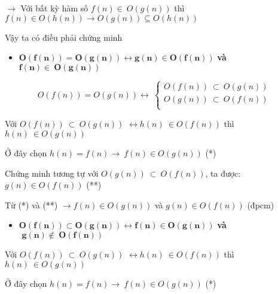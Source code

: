 \documentclass[
]{article}
\begin{document}
\(\rightarrow\) Với bất kỳ hàm số \(f(n) \in \ O(g(n))\) thì
\(f(n) \in O\left( h(n) \right)\mathbf{\rightarrow}O\left( g(n) \right) \subseteq O\left( h(n) \right)\)

Vậy ta có điều phải chứng minh

\begin{itemize}
\item
  \(\mathbf{O}\left( \mathbf{f}\left( \mathbf{n} \right) \right)\mathbf{= O}\left( \mathbf{g}\left( \mathbf{n} \right) \right)\mathbf{\leftrightarrow g}\left( \mathbf{n} \right)\mathbf{\in O}\left( \mathbf{f}\left( \mathbf{n} \right) \right)\)
  \textbf{và}
  \(\mathbf{f}\left( \mathbf{n} \right)\mathbf{\in \ O(g(n))}\)
\end{itemize}

\[O\left( f(n) \right) = O\left( g(n) \right) \leftrightarrow \ \left\{ \begin{matrix}
O\left( f(n) \right)\  \subset \ O\left( g(n) \right) \\
O\left( g(n) \right)\  \subset \ O\left( f(n) \right) \\
\end{matrix} \right.\ \]

Với \(O\left( f(n) \right)\  \subset \ O\left( g(n) \right)\)
\(\leftrightarrow h(n)\  \in O\left( f(n) \right)\) thì
\(h(n)\  \in O\left( g(n) \right)\)

Ở đây chọn \(h(n) = f(n) \rightarrow \ f(n) \in O\left( g(n) \right)\)
(*)

Chứng minh tương tự với
\(O\left( g(n) \right)\  \subset \ O\left( f(n) \right)\), ta được:
\(g(n) \in O\left( f(n) \right)\) (**)

Từ (*) và (**) \(\rightarrow f(n) \in O\left( g(n) \right)\) và
\(g(n) \in O\left( f(n) \right)\) (đpcm)

\begin{itemize}
\item
  \(\mathbf{O}\left( \mathbf{f}\left( \mathbf{n} \right) \right)\mathbf{\subset O}\left( \mathbf{g}\left( \mathbf{n} \right) \right)\mathbf{\leftrightarrow f}\left( \mathbf{n} \right)\mathbf{\in O}\left( \mathbf{g}\left( \mathbf{n} \right) \right)\)
  \textbf{và}
  \(\mathbf{\text{\ g}}\left( \mathbf{n} \right)\mathbf{\notin \ O(f(n))}\)
\end{itemize}

Với \(O\left( f(n) \right)\  \subset \ O\left( g(n) \right)\)
\(\leftrightarrow h(n)\  \in O\left( f(n) \right)\) thì
\(h(n)\  \in O\left( g(n) \right)\)

Ở đây chọn \(h(n) = f(n) \rightarrow \ f(n) \in O\left( g(n) \right)\)
(*)
\end{document}
